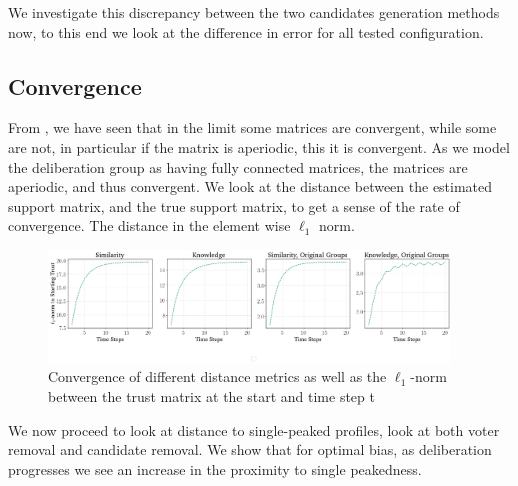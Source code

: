 We investigate this discrepancy between the two candidates generation methods
now, to this end we look at the difference in error for all tested
configuration.


\subsection{Convergence}

From , we have seen that in the limit some matrices are
convergent, while some are not, in particular if the matrix is aperiodic, this
it is convergent. As we model the deliberation group as having fully connected
matrices, the matrices are aperiodic, and thus convergent. We look at the
distance between the estimated support matrix, and the true support matrix, to
get a sense of the rate of convergence. The distance in the element wise
$\ell_1$ norm.

\begin{figure}
	\begin{center}
		\includegraphics[width=0.95\textwidth]{Figures/convergence_groups.png}
	\end{center}
	\caption{Convergence of different distance metrics as well as the
		$\ell_1$-norm between the trust matrix at the start and time step
		t}\label{fig:convergence_big}
\end{figure}



We now proceed to look at distance to single-peaked profiles, look at both
voter removal and candidate removal. We show that for optimal bias, as
deliberation progresses we see an increase in the proximity to single
peakedness.


